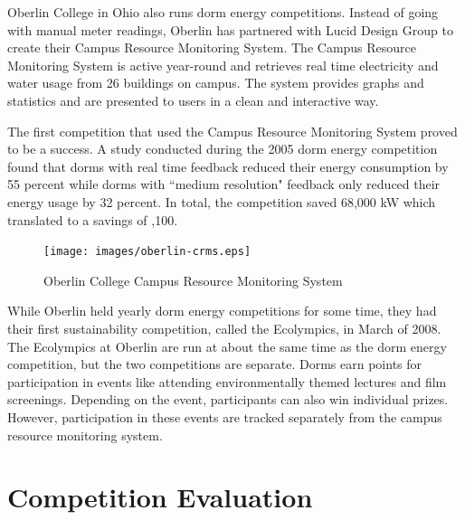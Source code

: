 Oberlin College in Ohio also runs dorm energy competitions.  Instead of going with manual meter readings, Oberlin has partnered with Lucid Design Group to create their Campus Resource Monitoring System\cite{oberlin-comp}.  The Campus Resource Monitoring System is active year-round and retrieves real time electricity and water usage from 26 buildings\cite{lucid-oberlin} on campus.  The system provides graphs and statistics and are presented to users in a clean and interactive way.

The first competition that used the Campus Resource Monitoring System proved to be a success.  A study conducted during the 2005 dorm energy competition found that dorms with real time feedback reduced their energy consumption by 55 percent while dorms with ``medium resolution" feedback only reduced their energy usage by 32 percent\cite{oberlin-goals}.  In total, the competition saved 68,000 kW which translated to a savings of ,100.

\begin{figure}
	\centering
	\texttt{[image: images/oberlin-crms.eps]}
	\caption{Oberlin College Campus Resource Monitoring System}
\end{figure}

While Oberlin held yearly dorm energy competitions for some time, they had their first sustainability competition, called the Ecolympics, in March of 2008\cite{oberlin-history}.  The Ecolympics at Oberlin are run at about the same time as the dorm energy competition, but the two competitions are separate.  Dorms earn points for participation in events like attending environmentally themed lectures and film screenings\cite{oberlin-news}.  Depending on the event, participants can also win individual prizes.  However, participation in these events are tracked separately from the campus resource monitoring system.

\section{Competition Evaluation}
\label{competition-evaluation}


